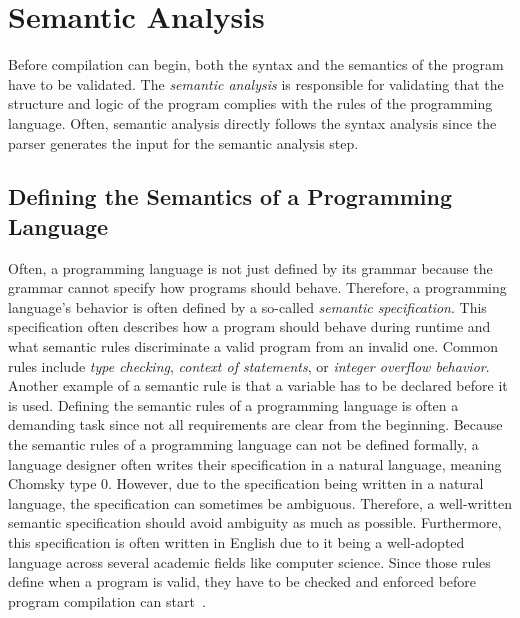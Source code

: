 \section{Semantic Analysis}
Before compilation can begin, both the syntax and the semantics of the program have to be validated.
The \emph{semantic analysis} is responsible for validating that the structure and logic of the program complies with the rules of the programming language.
Often, semantic analysis directly follows the syntax analysis since the parser generates the input for the semantic analysis step.

\subsection{Defining the Semantics of a Programming Language}
Often, a programming language is not just defined by its grammar
because the grammar cannot specify how programs should behave.
Therefore, a programming language's behavior is often defined by a so-called \emph{semantic specification}.
This specification often describes how a program should behave during runtime and what semantic rules discriminate a valid program from an invalid one.
Common rules include \emph{type checking}, \emph{context of statements}, or \emph{integer overflow behavior}.
Another example of a semantic rule is that a variable has to be declared before it is used.
Defining the semantic rules of a programming language is often a demanding task
since not all requirements are clear from the beginning.
Because the semantic rules of a programming language can not be defined formally,
a language designer often writes their specification in a natural language, meaning Chomsky type 0.
However, due to the specification being written in a natural language, the specification can sometimes be ambiguous.
Therefore, a well-written semantic specification should avoid ambiguity as much as possible.
Furthermore, this specification is often written in English
due to it being a well-adopted language across several academic fields like computer science.
Since those rules define when a program is valid, they have to be checked and enforced before program compilation can start~\cite[p.~21]{a_practical_guide_compiler_construction_watson_2017}.

